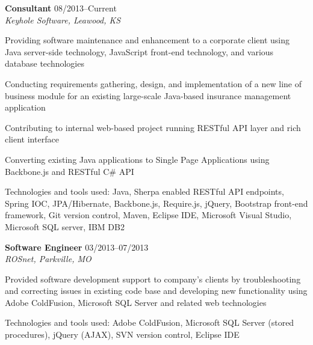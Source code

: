\begin{itemize1}
	\item \textbf{Consultant} \textopenbullet{} 08/2013--Current \\
		\textit{Keyhole Software, Leawood, KS} \vspace{-1.5mm}
		\begin{itemize1}
			\item Providing software maintenance and enhancement to a corporate client using Java server-side technology, JavaScript front-end technology, and various database technologies
			\item Conducting requirements gathering, design, and implementation of a new line of business module for an existing large-scale Java-based insurance management application
			\item Contributing to internal web-based project running RESTful API layer and rich client interface
			\item Converting existing Java applications to Single Page Applications using Backbone.js and RESTful C\# API
			\item Technologies and tools used: Java, Sherpa enabled RESTful API endpoints, Spring IOC, JPA/Hibernate, Backbone.js, Require.js, jQuery, Bootstrap front-end framework, Git version control, Maven, Eclipse IDE, Microsoft Visual Studio, Microsoft SQL server, IBM DB2
		\end{itemize1}
\end{itemize1}

\begin{itemize1}
	\item \textbf{Software Engineer} \textopenbullet{} 03/2013--07/2013 \\
		\textit{ROSnet, Parkville, MO} \vspace{-1.5mm}
		\begin{itemize1}
			\item Provided software development support to company's clients by troubleshooting and correcting issues in existing code base and developing new functionality using Adobe ColdFusion, Microsoft SQL Server and related web technologies
			\item Technologies and tools used: Adobe ColdFusion, Microsoft SQL Server (stored procedures), jQuery (AJAX), SVN version control, Eclipse IDE
		\end{itemize1}
\end{itemize1}

